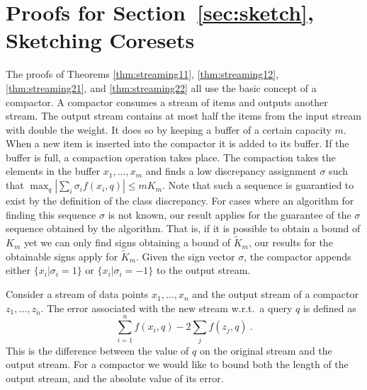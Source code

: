 \documentclass[anon,12pt]{colt2019} %
\begin{document}
\section{Proofs for Section~\ref{sec:sketch}, Sketching Coresets} \label{app:sketch proof}


The proofs of Theorems \ref{thm:streaming11}, \ref{thm:streaming12}, \ref{thm:streaming21}, and \ref{thm:streaming22} all use the basic concept of a compactor. A compactor consumes a stream of items and outputs another stream. 
The output stream contains at most half the items from the input stream with double the weight. 
It does so by keeping a buffer of a certain capacity $m$. When a new item is inserted into the compactor it is added to its buffer. 
If the buffer is full, a compaction operation takes place. 
The compaction takes the elements in the buffer $x_1,\ldots,x_m$ and finds a low discrepancy assignment $\sigma$ such that 
$\max_q |\sum_i \sigma_i f(x_i,q)| \leq m K_m$. 
Note that such a sequence is guarantied to exist by the definition of the class discrepancy. For cases where an algorithm for finding this sequence $\sigma$ is not known, our result applies for the guarantee of the $\sigma$ sequence obtained by the algorithm. That is, if it is possible to obtain a bound of $K_m$ yet we can only find signs obtaining a bound of $\tilde{K}_m$, our results for the obtainable signs apply for $\tilde{K}_m$.
Given the sign vector $\sigma$, the compactor appends either $\{ x_i | \sigma_i = 1\}$ or  $\{ x_i | \sigma_i = -1\}$ to the output stream. 

Consider a stream of data points $x_1,\ldots,x_n$ and the output stream of a compactor $z_1,\ldots,z_{\tilde{n}}$. The error associated with the new stream w.r.t.\ a query $q$ is defined as
$$ \sum_{i=1}^n f(x_i,q) - 2\sum_j f(z_j,q) \ .$$
This is the difference between the value of $q$ on the original stream and the output stream. For a compactor we would like to bound both the length of the output stream, and the absolute value of its error.
\end{document}
